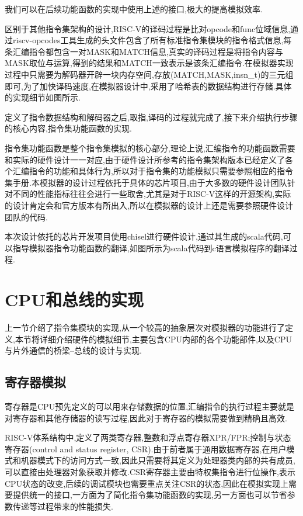 我们可以在后续功能函数的实现中使用上述的接口,极大的提高模拟效率.


区别于其他指令集架构的设计,RISC-V的译码过程是比对opcode和func位域信息,通过riscv-opcodes工具生成的头文件包含了所有标准指令集模块的指令格式信息,每条汇编指令都包含一对MASK和MATCH信息,真实的译码过程是将指令内容与MASK取位与运算,得到的结果和MATCH一致表示是该条汇编指令.在模拟器实现过程中只需要为解码器开辟一块内存空间,存放(MATCH,MASK,insn\_t)的三元组即可,为了加快译码速度,在模拟器设计中,采用了哈希表的数据结构进行存储.具体的实现细节如图所示.


定义了指令数据结构和解码器之后,取指,译码的过程就完成了,接下来介绍执行步骤的核心内容,指令集功能函数的实现.


指令集功能函数是整个指令集模拟的核心部分,理论上说,汇编指令的功能函数需要和实际的硬件设计一一对应,由于硬件设计所参考的指令集架构版本已经定义了各个汇编指令的功能和具体行为,所以对于指令集的功能模拟只需要参照相应的指令集手册.本模拟器的设计过程依托于具体的芯片项目,由于大多数的硬件设计团队针对不同的性能指标往往会进行一些取舍,尤其是对于RISC-V这样的开源架构,实际的设计肯定会和官方版本有所出入,所以在模拟器的设计上还是需要参照硬件设计团队的代码.


本次设计依托的芯片开发项目使用chisel进行硬件设计,通过其生成的scala代码,可以指导模拟器指令功能函数的翻译,如图所示为scala代码到c语言模拟程序的翻译过程.


\section{CPU和总线的实现}

上一节介绍了指令集模块的实现,从一个较高的抽象层次对模拟器的功能进行了定义,本节将详细介绍硬件的模拟细节,主要包含CPU内部的各个功能部件,以及CPU与片外通信的桥梁--总线的设计与实现.


\subsection{寄存器模拟}

寄存器是CPU预先定义的可以用来存储数据的位置,汇编指令的执行过程主要就是对寄存器和其他存储器的读写过程,因此对于寄存器的模拟需要做到精确且高效.


RISC-V体系结构中,定义了两类寄存器,整数和浮点寄存器XPR/FPR;控制与状态寄存器(control and status register, CSR).由于前者属于通用数据寄存器,在用户模式和机器模式下的访问方式一致,因此只需要将其定义为处理器类内部的共有成员,可以直接由处理器对象获取并修改.CSR寄存器主要由特权集指令进行位操作,表示CPU状态的改变,后续的调试模块也需要重点关注CSR的状态,因此在模拟实现上需要提供统一的接口,一方面为了简化指令集功能函数的实现,另一方面也可以节省参数传递等过程带来的性能损失.


